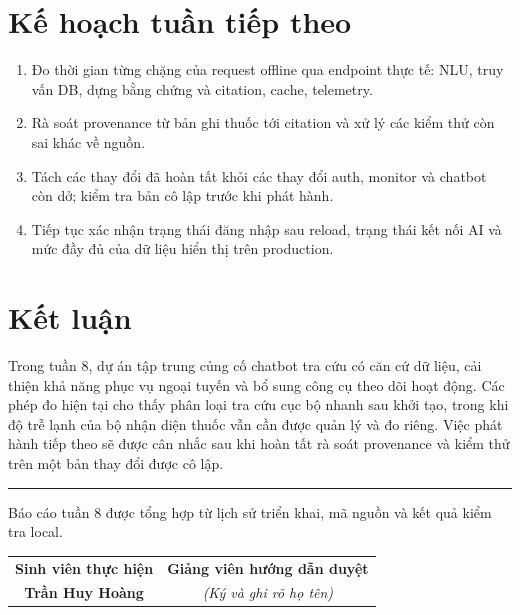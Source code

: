 \documentclass[11pt,a4paper]{article}
\begin{document}
\section{Kế hoạch tuần tiếp theo}
\begin{enumerate}
    \item Đo thời gian từng chặng của request offline qua endpoint thực tế: NLU, truy vấn DB, dựng bằng chứng và citation, cache, telemetry.
    \item Rà soát provenance từ bản ghi thuốc tới citation và xử lý các kiểm thử còn sai khác về nguồn.
    \item Tách các thay đổi đã hoàn tất khỏi các thay đổi auth, monitor và chatbot còn dở; kiểm tra bản cô lập trước khi phát hành.
    \item Tiếp tục xác nhận trạng thái đăng nhập sau reload, trạng thái kết nối AI và mức đầy đủ của dữ liệu hiển thị trên production.
\end{enumerate}

\section{Kết luận}
Trong tuần 8, dự án tập trung củng cố chatbot tra cứu có căn cứ dữ liệu, cải thiện khả năng phục vụ ngoại tuyến và bổ sung công cụ theo dõi hoạt động. Các phép đo hiện tại cho thấy phân loại tra cứu cục bộ nhanh sau khởi tạo, trong khi độ trễ lạnh của bộ nhận diện thuốc vẫn cần được quản lý và đo riêng. Việc phát hành tiếp theo sẽ được cân nhắc sau khi hoàn tất rà soát provenance và kiểm thử trên một bản thay đổi được cô lập.

\vfill
\noindent\textcolor{medblue}{\rule{\textwidth}{0.5pt}}
\begin{center}
    \small Báo cáo tuần 8 được tổng hợp từ lịch sử triển khai, mã nguồn và kết quả kiểm tra local.\\[0.35em]
    \begin{tabular*}{0.85\textwidth}{@{\extracolsep{\fill}}cc@{}}
        \textbf{Sinh viên thực hiện} & \textbf{Giảng viên hướng dẫn duyệt}\\[1.6em]
        \textbf{Trần Huy Hoàng} & \textit{(Ký và ghi rõ họ tên)}
    \end{tabular*}
\end{center}
\end{document}
